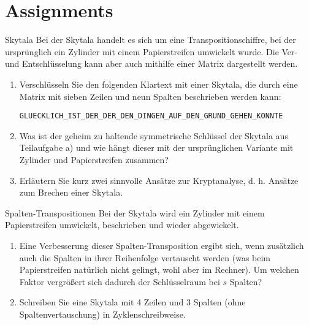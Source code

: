 \documentclass{article}
\author{Leopold Lemmermann}
\begin{document}
\createtitle

\section{Assignments}

\setcounter{subsection}{10}
\begin{exercise}{Skytala}
  Bei der Skytala handelt es sich um eine Transpositionschiffre, bei der ursprünglich ein Zylinder mit einem Papierstreifen umwickelt wurde. Die Ver- und Entschlüsselung kann aber auch mithilfe einer Matrix dargestellt werden.
  \begin{enumerate}
      \item Verschlüsseln Sie den folgenden Klartext mit einer Skytala, die durch eine Matrix mit sieben Zeilen und neun Spalten beschrieben werden kann:
      \begin{center}
          \texttt{GLUECKLICH\_IST\_DER\_DER\_DEN\_DINGEN\_AUF\_DEN\_GRUND\_GEHEN\_KONNTE}
      \end{center}
      \item Was ist der geheim zu haltende symmetrische Schlüssel der Skytala aus Teilaufgabe a) und wie hängt dieser mit der ursprünglichen Variante mit Zylinder und Papierstreifen zusammen?
      \item Erläutern Sie kurz zwei sinnvolle Ansätze zur Kryptanalyse, d. h. Ansätze zum Brechen einer Skytala.
  \end{enumerate}

  \begin{solution}
  \end{solution}
\end{exercise}

\begin{exercise}{Spalten-Transpositionen}
  Bei der Skytala wird ein Zylinder mit einem Papierstreifen umwickelt, beschrieben und wieder abgewickelt.
  \begin{enumerate}
      \item Eine Verbesserung dieser Spalten-Transposition ergibt sich, wenn zusätzlich auch die Spalten in ihrer Reihenfolge vertauscht werden (was beim Papierstreifen natürlich nicht gelingt, wohl aber im Rechner). Um welchen Faktor vergrößert sich dadurch der Schlüsselraum bei $s$ Spalten?
      \item Schreiben Sie eine Skytala mit 4 Zeilen und 3 Spalten (ohne Spaltenvertauschung) in Zyklenschreibweise.
  \end{enumerate}

  \begin{solution}
  \end{solution}
\end{exercise}
\end{document}
